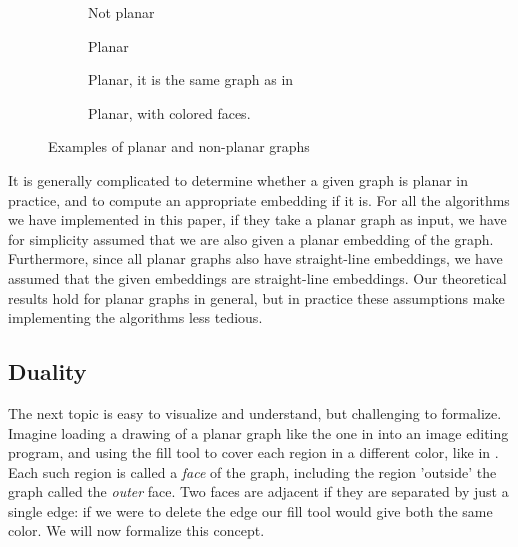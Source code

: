 \begin{figure}
    \centering
    \begin{subfigure}{.23\textwidth}
        \centering
        
        \caption{Not planar}
        \label{subfigure:k33}
    \end{subfigure}\hfill%
    \begin{subfigure}{.23\textwidth}
        \centering
        
        \caption{Planar}
        \label{subfigure:k4-a}
    \end{subfigure}\hfill%
    \begin{subfigure}{.23\textwidth}
        \centering
        
        \caption{Planar, it is the same graph as in }
        \label{subfigure:k4-b}
    \end{subfigure}\hfill%
    \begin{subfigure}{.23\textwidth}
        \centering
        
        \caption{Planar, with colored faces.}
        \label{subfigure:k4-c}
    \end{subfigure}
    \caption{Examples of planar and non-planar graphs}
\end{figure}

It is generally complicated to determine whether a given graph is planar in practice, and to compute an appropriate embedding if it is. For all the algorithms we have implemented in this paper, if they take a planar graph as input, we have for simplicity assumed that we are also given a planar embedding of the graph. Furthermore, since all planar graphs also have straight-line embeddings, we have assumed that the given embeddings are straight-line embeddings. Our theoretical results hold for planar graphs in general, but in practice these assumptions make implementing the algorithms less tedious.

\subsection{Duality}
The next topic is easy to visualize and understand, but challenging to formalize. Imagine loading a drawing of a planar graph like the one in  into an image editing program, and using the fill tool to cover each region in a different color, like in . Each such region is called a \emph{face} of the graph, including the region 'outside' the graph called the \emph{outer} face. Two faces are adjacent if they are separated by just a single edge: if we were to delete the edge our fill tool would give both the same color. We will now formalize this concept.


